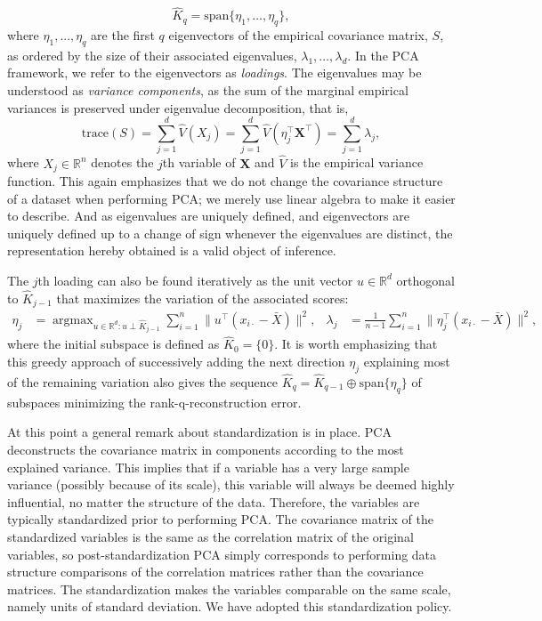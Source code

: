 \documentclass[a4paper,12pt]{article}
\newcommand{\RR}{\mathbb{R}}
\DeclareMathOperator*{\argmax}{argmax}
\begin{document}
\begin{equation*}
\hat{K}_q = \text{span}\{\eta_1,\dotsc,\eta_q\},
\end{equation*}
where $\eta_1, ..., \eta_q$ are the first $q$ eigenvectors of the empirical covariance matrix, $S$, as ordered by the size of their associated eigenvalues, $\lambda_1, \dotsc, \lambda_d$. In the PCA framework, we refer to the eigenvectors as \textit{loadings}. The eigenvalues may be understood as \textit{variance components}, as the sum of the marginal empirical variances is preserved under eigenvalue decomposition, that is,
\begin{equation*}
\text{trace}(S) = \sum_{j=1}^d \hat{V}(X_j) = \sum_{j=1}^d \hat{V}(\eta_j^\top \mathbf{X}^\top) = \sum_{j=1}^d \lambda_j,
\end{equation*}
where $X_j \in \RR^n$ denotes the $j$th variable of $\mathbf{X}$ and $\hat{V}$ is the empirical variance function. This again emphasizes that we do not change the covariance structure of a dataset when performing PCA; we merely use linear algebra to make it easier to describe. And as eigenvalues are uniquely defined, and eigenvectors are uniquely defined up to a change of sign whenever the eigenvalues are distinct, the representation hereby obtained is a valid object of inference. 

The $j$th loading can also be found iteratively as the unit vector $u \in \RR^d$ orthogonal to $\hat{K}_{j-1}$ that maximizes the variation of the associated scores:
\begin{align*}
\eta_j &= \argmax_{u \in \RR^d\colon u \perp \hat{K}_{j-1}} \sum_{i=1}^n \lVert u^\top (x_{i \cdot} - \bar{X}) \rVert^2, &
\lambda_j &= \frac{1}{n-1} \sum_{i=1}^n \lVert \eta_j^\top (x_{i \cdot} - \bar{X}) \rVert^2,
\end{align*}
where the initial subspace is defined as $\hat{K}_0 = \{0\}$. It is worth emphasizing that this greedy approach of successively adding the next direction $\eta_j$ explaining most of the remaining variation also gives the sequence $\hat{K}_q = \hat{K}_{q-1} \oplus \text{span} \{\eta_q\}$ of subspaces minimizing the rank-q-reconstruction error.

At this point a general remark about standardization is in place. PCA deconstructs the covariance matrix in components according to the most explained variance. This implies that if a variable has a very large sample variance (possibly because of its scale), this variable will always be deemed highly influential, no matter the structure of the data. Therefore, the variables are typically standardized prior to performing PCA. The covariance matrix of the standardized variables is the same as the correlation matrix of the original variables, so post-standardization PCA simply corresponds to performing data structure comparisons of the correlation matrices rather than the covariance matrices. The standardization makes the variables comparable on the same scale, namely units of standard deviation. We have adopted this standardization policy. 
\end{document}
